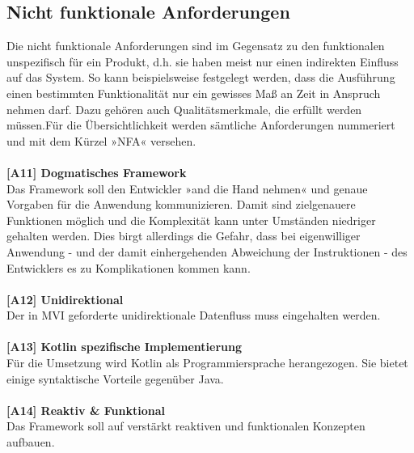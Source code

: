 \subsection{Nicht funktionale Anforderungen}
Die nicht funktionale Anforderungen sind im Gegensatz zu den funktionalen unspezifisch für ein Produkt, d.h. sie haben meist nur einen indirekten Einfluss auf das System. So kann beispielsweise festgelegt werden, dass die Ausführung einen bestimmten Funktionalität nur ein gewisses Maß an Zeit in Anspruch nehmen darf. Dazu gehören auch Qualitätsmerkmale, die erfüllt werden müssen.Für die Übersichtlichkeit werden sämtliche Anforderungen nummeriert und mit dem Kürzel »NFA« versehen.
\\
\\
\textbf{[A11] Dogmatisches Framework}
\\
Das Framework soll den Entwickler »and die Hand nehmen« und genaue Vorgaben für die Anwendung kommunizieren. Damit sind zielgenauere Funktionen möglich und die Komplexität kann unter Umständen niedriger gehalten werden. Dies birgt allerdings die Gefahr, dass bei eigenwilliger Anwendung - und der damit einhergehenden Abweichung der Instruktionen - des Entwicklers es zu Komplikationen kommen kann.
\\
\\
\textbf{[A12] Unidirektional}
\\
Der in MVI geforderte unidirektionale Datenfluss muss eingehalten werden.
\\
\\
\textbf{[A13] Kotlin spezifische Implementierung}
\\
Für die Umsetzung wird Kotlin als Programmiersprache herangezogen. Sie bietet einige syntaktische Vorteile gegenüber Java.
\\
\\
\textbf{[A14] Reaktiv \& Funktional}
\\
Das Framework soll auf verstärkt reaktiven und funktionalen Konzepten aufbauen.
